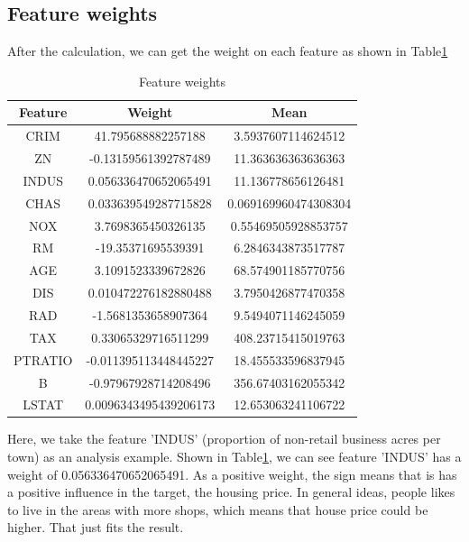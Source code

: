 \documentclass[a4paper]{article}
\begin{document}
\subsection{Feature weights}

After the calculation, we can get the weight on each feature as shown in Table\ref{tab: Feature weights}

\begin{table}[htbp]
\centering
\begin{tabular}{|c|c|c|}
    \hline
    Feature & Weight & Mean\\
    \hline
    CRIM & 41.795688882257188 & 3.5937607114624512\\
    \hline
    ZN & -0.13159561392787489 & 11.363636363636363\\
    \hline
    INDUS & 0.056336470652065491 & 11.136778656126481\\
    \hline
    CHAS & 0.033639549287715828 & 0.069169960474308304\\
    \hline
    NOX & 3.7698365450326135 & 0.55469505928853757\\
    \hline
    RM & -19.35371695539391 & 6.2846343873517787\\
    \hline
    AGE & 3.1091523339672826 & 68.574901185770756\\
    \hline
    DIS & 0.010472276182880488 & 3.7950426877470358\\
    \hline
    RAD & -1.5681353658907364
     & 9.5494071146245059\\
    \hline
    TAX & 0.33065329716511299 & 408.23715415019763\\
    \hline
    PTRATIO & -0.011395113448445227 & 18.455533596837945\\
    \hline
    B & -0.97967928714208496 & 356.67403162055342\\
    \hline
    LSTAT & 0.0096343495439206173 & 12.653063241106722\\
    \hline
    \end{tabular}
\caption{Feature weights}
\label{tab: Feature weights}
\end{table}

Here, we take the feature 'INDUS' (proportion of non-retail business acres per town) as an analysis example. Shown in Table\ref{tab: Feature weights}, we can see feature 'INDUS' has a weight of 0.056336470652065491. As a positive weight, the sign means that is has a positive influence in the target, the housing price. In general ideas, people likes to live in the areas with more shops, which means that house price could be higher. That just fits the result.
\end{document}
